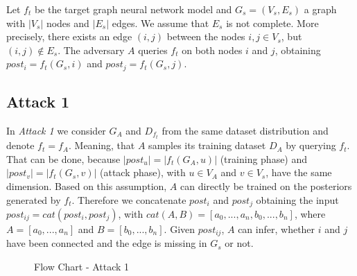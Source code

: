     Let $f_t$ be the target graph neural network model and $G_s = (V_s, E_s)$ a graph with $|V_s|$ nodes and $|E_s|$ edges.
    We assume that $E_s$ is not complete. 
    More precisely, there exists an edge $(i,j)$ between the nodes $i,j \in V_s$, but $(i,j) \not\in E_s$.
    The adversary $A$ queries $f_t$ on both nodes $i$ and $j$, obtaining $post_i = f_t(G_s, i)$ and $post_j = f_t(G_s, j)$.

    \subsection*{Attack 1}
      In \emph{Attack 1} we consider $G_A$ and $D_{f_t}$ from the same dataset distribution and denote $f_t = f_A$.
      Meaning, that $A$ samples its training dataset $D_A$ by querying $f_t$.
      That can be done, because $|post_u| = |f_t(G_A,u)|$ (training phase) and $|post_v| = |f_t(G_s,v)|$ (attack phase), with $u \in V_A$ and $v \in V_s$, have the same dimension.
      Based on this assumption, $A$ can directly be trained on the posteriors generated by $f_t$.
      Therefore we concatenate $post_i$ and $post_j$ obtaining the input $post_{ij} = cat(post_i, post_j)$, with $cat(A,B) = [a_0,...,a_n,b_0,...,b_n]$, where $A = [a_0,...,a_n]$ and $B = [b_0,...,b_n]$. 
      Given $post_{ij}$, $A$ can infer, whether $i$ and $j$ have been connected and the edge is missing in $G_s$ or not.

      \vspace{0.48cm}
      \begin{figure}[h!]
        \caption{Flow Chart - Attack 1}
        \label{figure:flow-chart-attack-1}
      \end{figure}

